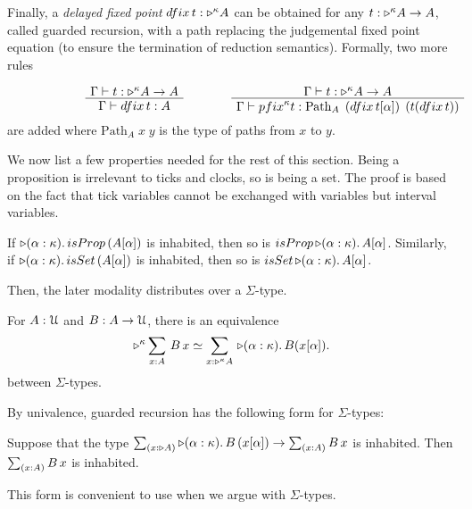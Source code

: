 \documentclass[a4paper,UKenglish,numberwithinsect,cleveref,thm-restate]{lipics-v2021}
\numberwithin{equation}{section}
\theoremstyle{plain}
\begin{document}
  Finally, a \emph{delayed fixed point} $\mathsf{dfix}\,t : \laterp^\kappa A$ can be obtained for any $t : \mathord{\triangleright}^\kappa A \to A$, called guarded recursion, with a path replacing the judgemental fixed point equation (to ensure the termination of reduction semantics).
Formally, two more rules
\[
  \begin{minipage}{0.47\linewidth}
    \begin{prooftree}
      \AxiomC{$\Gamma \vdash t : \laterp^\kappa A \to A$}
      \UnaryInfC{$\Gamma \vdash \mathsf{dfix}\,t : A$}
    \end{prooftree}
  \end{minipage}
  \begin{minipage}{0.47\linewidth}
    \begin{prooftree}
      \AxiomC{$\Gamma \vdash t : \laterp^\kappa A \to A$}
      \UnaryInfC{$\Gamma \vdash \mathsf{pfix}^\kappa t : \mathrm{Path}_A\;\left(\mathsf{dfix}\,t[\alpha]\right)\;\left(t(\mathsf{dfix}\,t)\right)$}
    \end{prooftree}
  \end{minipage}
\]
are added where $\mathrm{Path}_A\;x\;y$ is the type of paths from $x$ to $y$.

We now list a few properties needed for the rest of this section.
Being a proposition is irrelevant to ticks and clocks, so is being a set.
The proof is based on the fact that tick variables cannot be exchanged with variables but interval variables.
\begin{lemma}
  If $\laterp (\alpha : \kappa).\, \mathsf{isProp}\,(A [\alpha])$ is inhabited, then so is $\mathsf{isProp}\,\laterp(\alpha: \kappa).\, A [\alpha]$. 
  Similarly, if $\laterp (\alpha : \kappa).\, \mathsf{isSet}\,(A [\alpha])$ is inhabited, then so is $\mathsf{isSet}\,\laterp(\alpha: \kappa).\, A [\alpha]$. 
\end{lemma}

Then, the later modality distributes over a $\Sigma$-type.
\begin{lemma}\label{lem:later-sum}
  For $A : \mathcal{U}$ and $B : A \to \mathcal{U}$, there is an equivalence
  \begin{equation}\label{eq:later-sum}
    \eqv{\laterp^\kappa \sm{x : A} B\,x}{\sm{x : \laterp^\kappa A} \laterp (\alpha : \kappa).\, B (x [\alpha])}.
  \end{equation}
  between $\Sigma$-types.
\end{lemma}

By univalence, guarded recursion has the following form for $\Sigma$-types:
\begin{corollary} \label{coro:lob-induction-sum}
  Suppose that the type $\sm{x : \laterp A} \laterp (\alpha : \kappa).\,B\,(x[\alpha]) \to \sm{x : A} B\,x$ is inhabited.
  Then $\sm{x : A} B\,x$ is inhabited.
\end{corollary}
This form is convenient to use when we argue with $\Sigma$-types.
\end{document}
